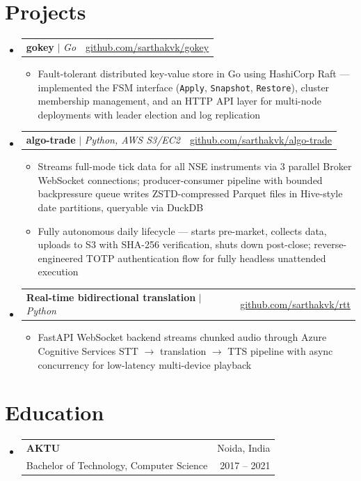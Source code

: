 \documentclass[letterpaper,10pt]{article}
\makeatletter
\newcommand{\resumeItem}[1]{
  \item\small{
    {#1 \vspace{-2pt}}
  }
}
\newcommand{\resumeSubheading}[5]{
  \vspace{-2pt}\item
    \begin{tabular*}{0.97\textwidth}[t]{l@{\extracolsep{\fill}}r}
      \textbf{#1} & #2 \\
      {\small#3} & {\small #4} \\
    \end{tabular*}
    \ifx\relax#5\relax\else\\\small\textit{#5}\fi\vspace{-5pt}
}
\newcommand{\resumeProjectHeading}[2]{
    \item
    \begin{tabular*}{0.97\textwidth}{l@{\extracolsep{\fill}}r}
      \small#1 & #2 \\
    \end{tabular*}\vspace{-7pt}
}
\newcommand{\resumeSubHeadingListStart}{\begin{itemize}[leftmargin=0.15in, label={}]}
\newcommand{\resumeSubHeadingListEnd}{\end{itemize}}
\newcommand{\resumeItemListStart}{\begin{itemize}[itemsep=4pt, parsep=0pt]}
\newcommand{\resumeItemListEnd}{\end{itemize}\vspace{-5pt}}
\makeatother
\begin{document}

\section{Projects}
    \resumeSubHeadingListStart

      \resumeProjectHeading
          {\textbf{gokey} $|$ \emph{Go}}{\href{https://github.com/sarthakvk/gokey}{\underline{github.com/sarthakvk/gokey}}}
          \resumeItemListStart
            \resumeItem{Fault-tolerant distributed key-value store in Go using HashiCorp Raft --- implemented the FSM interface (\texttt{Apply}, \texttt{Snapshot}, \texttt{Restore}), cluster membership management, and an HTTP API layer for multi-node deployments with leader election and log replication}
          \resumeItemListEnd

      \resumeProjectHeading
          {\textbf{algo-trade} $|$ \emph{Python, AWS S3/EC2}}{\href{https://github.com/sarthakvk/algo-trade}{\underline{github.com/sarthakvk/algo-trade}}}
          \resumeItemListStart
            \resumeItem{Streams full-mode tick data for all NSE instruments via 3 parallel Broker WebSocket connections; producer-consumer pipeline with bounded backpressure queue writes ZSTD-compressed Parquet files in Hive-style date partitions, queryable via DuckDB}
            \resumeItem{Fully autonomous daily lifecycle --- starts pre-market, collects data, uploads to S3 with SHA-256 verification, shuts down post-close; reverse-engineered TOTP authentication flow for fully headless unattended execution}
          \resumeItemListEnd

      \resumeProjectHeading
          {\textbf{Real-time bidirectional translation } $|$ \emph{Python}}{\href{https://github.com/sarthakvk/rtt}{\underline{github.com/sarthakvk/rtt}}}
          \resumeItemListStart
            \resumeItem{FastAPI WebSocket backend streams chunked audio through Azure Cognitive Services STT $\rightarrow$ translation $\rightarrow$ TTS pipeline with async concurrency for low-latency multi-device playback}
          \resumeItemListEnd

    \resumeSubHeadingListEnd

\section{Education}
  \resumeSubHeadingListStart
    \resumeSubheading
      {AKTU}{Noida, India}
      {Bachelor of Technology, Computer Science}{2017 -- 2021}
      {}
  \resumeSubHeadingListEnd
\end{document}
